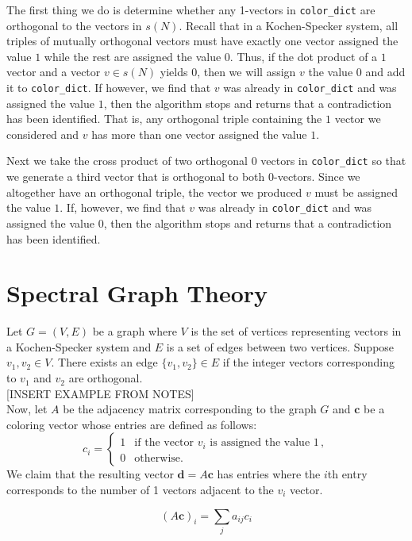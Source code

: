 \documentclass[11pt]{article}
\begin{document}
\hspace{\parindent}The first thing we do is determine whether any 1-vectors in \texttt{color\_dict} are orthogonal to the vectors in $s(N)$. Recall that in a Kochen-Specker system, all triples of mutually orthogonal vectors must have exactly one vector assigned the value $1$ while the rest are assigned the value $0$. Thus, if the dot product of a $1$ vector and a vector $v \in s(N)$ yields $0$, then we will assign $v$ the value 0 and add it to \texttt{color\_dict}. If however, we find that $v$ was already in \texttt{color\_dict} and was assigned the value $1$, then the algorithm stops and returns that a contradiction has been identified. That is, any orthogonal triple containing the $1$ vector we considered and $v$ has more than one vector assigned the value $1$.

Next we take the cross product of two orthogonal $0$ vectors in \texttt{color\_dict} so that we generate a third vector that is orthogonal to both 0-vectors. Since we altogether have an orthogonal triple, the vector we produced $v$ must be assigned the value $1$. If, however, we find that $v$ was already in \texttt{color\_dict} and was assigned the value $0$, then the algorithm stops and returns that a contradiction has been identified.

\section{Spectral Graph Theory}
\hspace{\parindent}Let $G = (V, E)$ be a graph where $V$ is the set of vertices representing  vectors in a Kochen-Specker system and $E$ is a set of edges between two vertices. Suppose $v_{1}, v_{2} \in V$. There exists an edge $\{v_{1}, v_{2}\} \in E$ if the integer vectors corresponding to $v_{1}$ and $v_{2}$ are orthogonal.\\

[INSERT EXAMPLE FROM NOTES]\\

Now, let $A$ be the adjacency matrix corresponding to the graph $G$ and $\mathbf{c}$ be a coloring vector whose entries are defined as follows:
\[c_{i} = \begin{cases} 1 & \text{if the vector } v_{i} \text{ is assigned the value 1} \,, \\
						0 & \text{otherwise.}
\end{cases}\]
We claim that the resulting vector $\mathbf{d} = A \mathbf{c}$ has entries where the $i$th entry corresponds to the number of 1 vectors adjacent to the $v_{i}$ vector.


\[(A\mathbf{c})_{i} = \sum_{j} a_{ij} c_{i}\]
	

\end{document}
